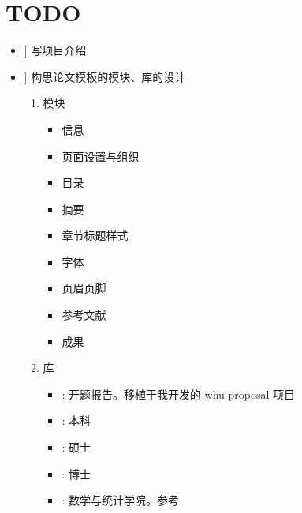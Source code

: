 

\chapter{TODO}

\newcommand\Done{\faCheckSquare[regular]} %
\newcommand\HalfDone{\faMinusSquare[regular]} %
\newcommand\NotDone{\faSquare[regular]} %
\newcommand\ToBeSpecified{\faPlusSquare[regular]} %

\goodbreak
\begin{itemize}[midpenalty=-1000,
  label=\protect\raisebox{-.3ex}{\NotDone}]
  \item[\Done] 写项目介绍
  \item[\ToBeSpecified] 构思论文模板的模块、库的设计
    \begin{enumerate}
      \item 模块
        \begin{itemize}[midpenalty=-1000,
          label=\protect\raisebox{-.3ex}{\NotDone}]
          \item 信息
          \item 页面设置与组织
          \item 目录
          \item 摘要
          \item 章节标题样式
          \item 字体
          \item 页眉页脚
          \item 参考文献
          \item 成果
        \end{itemize}
      \item 库
        \begin{itemize}[midpenalty=-1000,
          label=\protect\raisebox{-.3ex}{\NotDone}]
          \item {}: 开题报告。移植于我开发的 \href{https://github.com/whutug/whu-proposal}{whu-proposal 项目}
          \item {}: 本科
          \item {}: 硕士
          \item {}: 博士
          \item {}: 数学与统计学院。参考
            \begin{itemize}

\end{itemize}
\end{itemize}
\end{enumerate}
\end{itemize}
